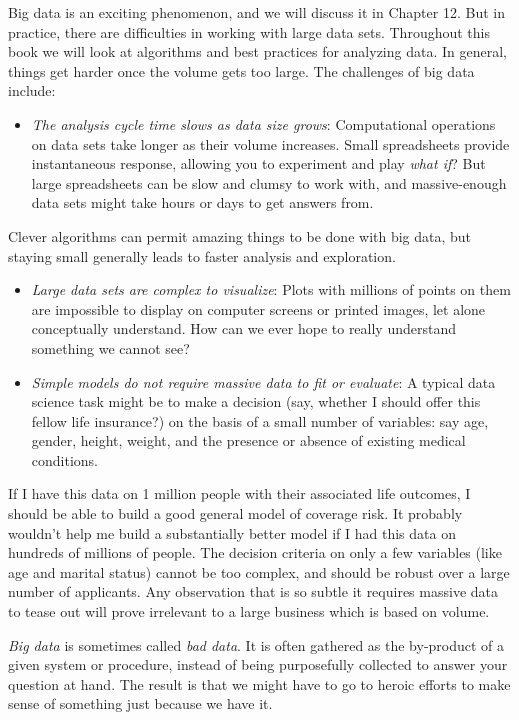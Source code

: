 \documentclass[10pt]{article}
\begin{document}
Big data is an exciting phenomenon, and we will discuss it in Chapter 12. But in practice, there are difficulties in working with large data sets. Throughout this book we will look at algorithms and best practices for analyzing data. In general, things get harder once the volume gets too large. The challenges of big data include:

\begin{itemize}
  \item \textit{The analysis cycle time slows as data size grows}: Computational operations on data sets take longer as their volume increases. Small spreadsheets provide instantaneous response, allowing you to experiment and play \textit{what if}? But large spreadsheets can be slow and clumsy to work with, and massive-enough data sets might take hours or days to get answers from.
\end{itemize}

Clever algorithms can permit amazing things to be done with big data, but staying small generally leads to faster analysis and exploration.

\begin{itemize}
  \item \textit{Large data sets are complex to visualize}: Plots with millions of points on them are impossible to display on computer screens or printed images, let alone conceptually understand. How can we ever hope to really understand something we cannot see?
  \item \textit{Simple models do not require massive data to fit or evaluate}: A typical data science task might be to make a decision (say, whether I should offer this fellow life insurance?) on the basis of a small number of variables: say age, gender, height, weight, and the presence or absence of existing medical conditions.
\end{itemize}

If I have this data on 1 million people with their associated life outcomes, I should be able to build a good general model of coverage risk. It probably wouldn’t help me build a substantially better model if I had this data on hundreds of millions of people. The decision criteria on only a few variables (like age and marital status) cannot be too complex, and should be robust over a large number of applicants. Any observation that is so subtle it requires massive data to tease out will prove irrelevant to a large business which is based on volume.

\textit{Big data} is sometimes called \textit{bad data}. It is often gathered as the by-product of a given system or procedure, instead of being purposefully collected to answer your question at hand. The result is that we might have to go to heroic efforts to make sense of something just because we have it.
\end{document}
